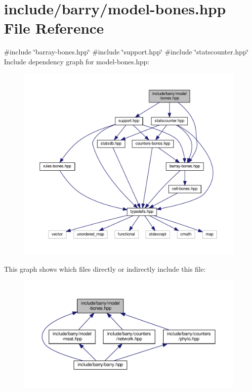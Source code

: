 \hypertarget{model-bones_8hpp}{}\section{include/barry/model-\/bones.hpp File Reference}
\label{model-bones_8hpp}
{\ttfamily \#include \char`\"{}barray-\/bones.\+hpp\char`\"{}}\newline
{\ttfamily \#include \char`\"{}support.\+hpp\char`\"{}}\newline
{\ttfamily \#include \char`\"{}statscounter.\+hpp\char`\"{}}\newline
Include dependency graph for model-\/bones.hpp\+:
\nopagebreak
\begin{figure}[H]
\begin{center}
\leavevmode
\includegraphics[width=350pt]{model-bones_8hpp__incl}
\end{center}
\end{figure}
This graph shows which files directly or indirectly include this file\+:
\nopagebreak
\begin{figure}[H]
\begin{center}
\leavevmode
\includegraphics[width=350pt]{model-bones_8hpp__dep__incl}
\end{center}
\end{figure}
